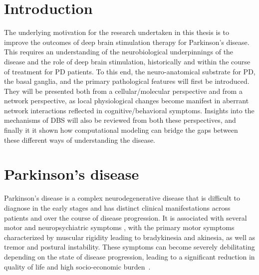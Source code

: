 %
%
%
%
%
%
%

\section{Introduction}

The underlying motivation for the research undertaken in this thesis is to improve the
outcomes of deep brain stimulation therapy for Parkinson's disease. This
requires an understanding of the neurobiological underpinnings of the disease
and the role of deep brain stimulation, historically and within the course
of treatment for PD patients. To this end, the neuro-anatomical substrate for
PD, the basal ganglia, and the primary pathological features will first be
introduced. They will be presented both from a cellular/molecular perspective
and from a network perspective, as local physiological changes become manifest
in aberrant network interactions reflected in cognitive/behavioral symptoms.
Insights into the mechanisms of DBS will also be reviewed from both these
perspectives, and finally it it shown how computational modeling can bridge
the gaps between these different ways of understanding the disease.

%
%
%
\section{Parkinson's disease}
%
%
%
%

%
Parkinson's disease is a complex neurodegenerative disease that is difficult
to diagnose in the early stages and has distinct clinical manifestations across
patients and over the course of disease progression. It is associated with several
motor and neuropsychiatric symptoms \cite{jankovic_parkinsons_2008}, with the
primary motor symptoms characterized by muscular rigidity leading to bradykinesia and
akinesia, as well as tremor and postural instability. These symptoms can become
severely debilitating depending on the state of disease progression, leading to
a significant reduction in quality of life and high socio-economic
burden~\cite{gustavsson2011cost,wittchen2011size,olesen2012economic}.

